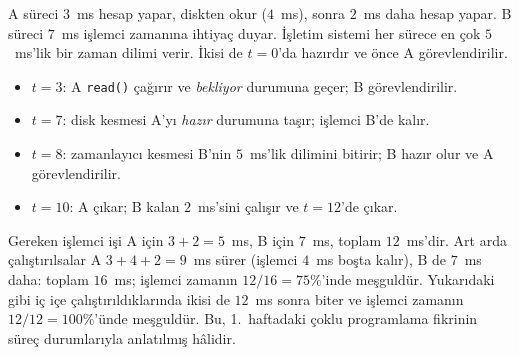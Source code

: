 \documentclass[11pt,a4paper]{article}
\newcommand{\cmd}[1]{\texttt{#1}}
\begin{document}
\begin{example}
A süreci $3$~ms hesap yapar, diskten okur ($4$~ms), sonra $2$~ms daha hesap yapar. B süreci $7$~ms işlemci zamanına ihtiyaç duyar. İşletim sistemi her sürece en çok $5$~ms'lik bir zaman dilimi verir. İkisi de $t = 0$'da hazırdır ve önce A görevlendirilir.

\begin{center}
\end{center}

\begin{itemize}
  \item $t = 3$: A \cmd{read()} çağırır ve \emph{bekliyor} durumuna geçer; B görevlendirilir.
  \item $t = 7$: disk kesmesi A'yı \emph{hazır} durumuna taşır; işlemci B'de kalır.
  \item $t = 8$: zamanlayıcı kesmesi B'nin $5$~ms'lik dilimini bitirir; B hazır olur ve A görevlendirilir.
  \item $t = 10$: A çıkar; B kalan $2$~ms'sini çalışır ve $t = 12$'de çıkar.
\end{itemize}
Gereken işlemci işi A için $3 + 2 = 5$~ms, B için $7$~ms, toplam $12$~ms'dir. Art arda çalıştırılsalar A $3 + 4 + 2 = 9$~ms sürer (işlemci $4$~ms boşta kalır), B de $7$~ms daha: toplam $16$~ms; işlemci zamanın $12/16 = 75\%$'inde meşguldür. Yukarıdaki gibi iç içe çalıştırıldıklarında ikisi de $12$~ms sonra biter ve işlemci zamanın $12/12 = 100\%$'ünde meşguldür. Bu, 1.~haftadaki çoklu programlama fikrinin süreç durumlarıyla anlatılmış hâlidir.
\end{example}
\end{document}
